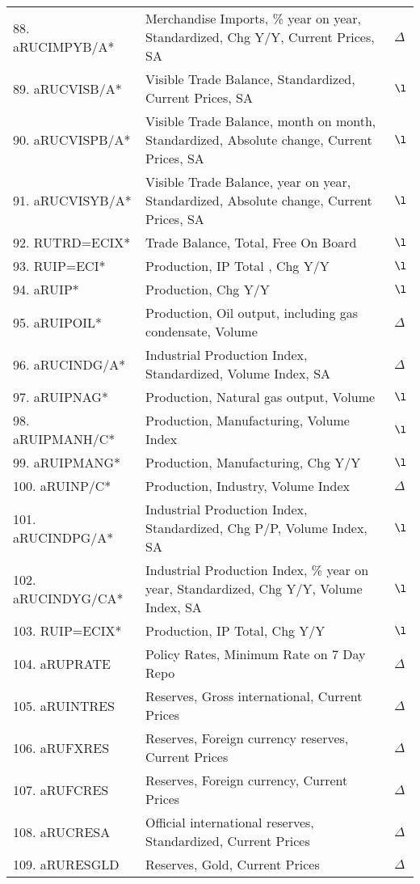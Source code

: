 \documentclass[a4paper, 14pt]{article}
\begin{document}
\begin{center}
\begin{longtable}{p{5.5cm} p{10cm} p{0.15cm}}
	88. aRUCIMPYB/A* &  Merchandise Imports, \% year on year, Standardized, Chg Y/Y, Current Prices, SA & $\Delta$\\
	89. aRUCVISB/A* &  Visible Trade Balance, Standardized, Current Prices, SA & $\l$\\
	90. aRUCVISPB/A* &  Visible Trade Balance, month on month, Standardized, Absolute change, Current Prices, SA & $\l$\\
	91. aRUCVISYB/A* &  Visible Trade Balance, year on year, Standardized, Absolute change, Current Prices, SA & $\l$\\
	92. RUTRD=ECIX* &  Trade Balance, Total, Free On Board & $\l$\\
	93. RUIP=ECI* &  Production, IP Total , Chg Y/Y & $\l$\\
	94. aRUIP* &  Production, Chg Y/Y & $\l$\\
	95. aRUIPOIL* &  Production, Oil output, including gas condensate, Volume & $\Delta$\\
	96. aRUCINDG/A* &  Industrial Production Index, Standardized, Volume Index, SA & $\Delta$\\
	97. aRUIPNAG* &  Production, Natural gas output, Volume & $\l$\\
	98. aRUIPMANH/C* &  Production, Manufacturing, Volume Index & $\l$\\
	99. aRUIPMANG* &  Production, Manufacturing, Chg Y/Y & $\l$\\
	100. aRUINP/C* &  Production, Industry, Volume Index & $\Delta$\\
	101. aRUCINDPG/A* &  Industrial Production Index, Standardized, Chg P/P, Volume Index, SA & $\l$\\
	102. aRUCINDYG/CA* &  Industrial Production Index, \% year on year, Standardized, Chg Y/Y, Volume Index, SA & $\l$\\
	103. RUIP=ECIX* &  Production, IP Total, Chg Y/Y & $\l$\\
	104. aRUPRATE &  Policy Rates, Minimum Rate on 7 Day Repo & $\Delta$\\
	105. aRUINTRES &  Reserves, Gross international, Current Prices & $\Delta$\\
	106. aRUFXRES &  Reserves, Foreign currency reserves, Current Prices & $\Delta$\\
	107. aRUFCRES &  Reserves, Foreign currency, Current Prices & $\Delta$\\
	108. aRUCRESA &  Official international reserves, Standardized, Current Prices & $\Delta$\\
	109. aRURESGLD &  Reserves, Gold, Current Prices & $\Delta$\\

\end{longtable}
\end{center}
\end{document}
